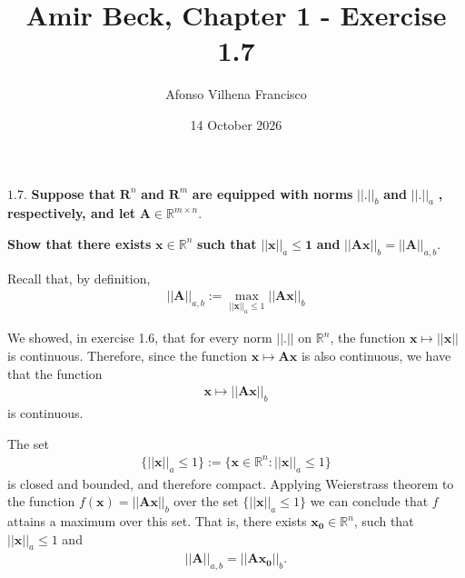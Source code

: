 \documentclass{article}
\title{Amir Beck, Chapter 1 - Exercise 1.7}
\author{Afonso Vilhena Francisco}
\date{14 October 2026}
\begin{document}
\maketitle

$\mathbf{1.7.}$ \textbf{Suppose that} $\mathbf{R}^n$ \textbf{and} $\mathbf{R}^m$ \textbf{are equipped with norms} $\mathbf{||.||}_b$ \textbf{and} $\mathbf{||.||}_a$ \textbf{, respectively, and let} $\mathbf{A \in \mathbb{R}}^{m\times n}$.

\textbf{Show that there exists} $\mathbf{x \in \mathbb{R}}^n$ \textbf{such that} $\mathbf{||x||}_a \mathbf{\leq 1}$ \textbf{and} $\mathbf{||Ax||}_b \mathbf{=||A||}_{a,b}.$

\vspace{0.3cm}

Recall that, by definition,
\begin{align*}
    ||\mathbf{A}||_{a,b}:=\max_{||\mathbf{x}||_a\leq 1}||\mathbf{Ax}||_b
\end{align*}

We showed, in exercise 1.6, that for every norm $||.||$ on $\mathbb{R}^n$, the function $\mathbf{x} \mapsto ||\mathbf{x||}$ is continuous. Therefore, since the function $\mathbf{x} \mapsto \mathbf{Ax}$ is also continuous, we have that the function
\begin{align*}
    \mathbf{x} \mapsto ||\mathbf{Ax}||_b
\end{align*}
is continuous.

The set
\begin{align*}
    \{||\mathbf{x}||_a \leq 1\}:=\{\mathbf{x} \in \mathbb{R}^n:||\mathbf{x}||_a \leq 1\}
\end{align*}
is closed and bounded, and therefore compact. Applying Weierstrass theorem to the function $f(\mathbf{x})= ||\mathbf{Ax}||_b$ over the set $\{||\mathbf{x}||_a \leq 1\}$ we can conclude that $f$ attains a maximum over this set. That is, there exists $\mathbf{x_0} \in \mathbb{R}^n$, such that $||\mathbf{x}||_a \leq 1$ and
\begin{align*}
    ||\mathbf{A}||_{a,b}=||\mathbf{Ax_0}||_b.
\end{align*}
\end{document}
